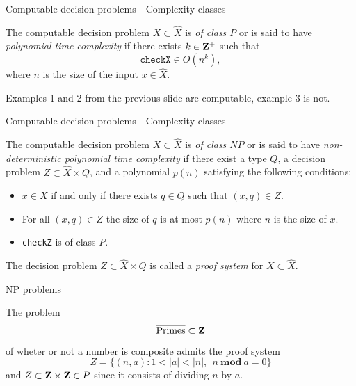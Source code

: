 %

\begin{frame}{Computable decision problems - Complexity classes}
	\begin{defn}
		The computable decision problem $X \subset \hat{X}$ is
		\emph{of class $P$} or is said to have \emph{polynomial time complexity}
		if there exists $k \in \mathbf{Z}^+$ such that
		\[
			\mathtt{checkX} \in O(n^k),
		\]
		where $n$ is the size of the input $x \in \hat{X}$.
	\end{defn}

	\pause
	\begin{exl}
		Examples 1 and 2 from the previous slide are computable, example 3 is
		not.
	\end{exl}
\end{frame}

%

\begin{frame}{Computable decision problems - Complexity classes}
	\begin{defn}
		The computable decision problem $X \subset \hat{X}$ is
		\emph{of class $NP$} or is said to have
		\emph{non-deterministic polynomial time complexity} if there exist
		a type $Q$, a decision problem $Z \subset \hat{X} \times Q$, and a
		polynomial $p(n)$ satisfying the following conditions:
		\begin{itemize}
			\item $x \in X$ if and only if there exists $q \in Q$ such that
				$(x, q) \in Z$.
			\item For all $(x, q) \in Z$ the size of $q$ is at most $p(n)$
				where $n$ is the size of $x$.
			\item \texttt{checkZ} is of class $P$.
		\end{itemize}

		The decision problem $Z \subset \hat{X} \times Q$ is called a
		\emph{proof system} for $X \subset \hat{X}$.
	\end{defn}
\end{frame}

%

\begin{frame}{NP problems}
	\begin{exl}
		The problem
		\[
			\overline{\text{Primes}} \subset \mathbf{Z}
		\]
		of wheter or not a number is composite admits the proof system
		\[
			Z= \{(n, a) : 1 < |a| < |n|,\ \ n \ 
				\mathbf{mod}\ a = 0\}
		\]
		and
		\(
			Z \subset \mathbf{Z} \times \mathbf{Z} \in P
		\)
		since it consists of dividing $n$ by $a$.
	\end{exl}
\end{frame}

